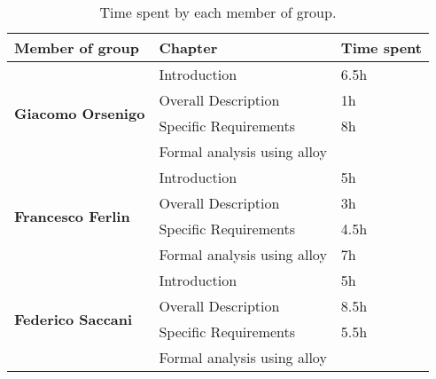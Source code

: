 \begin{table}[H]
      \centering
      \begin{tabular}{|l|l|l|}
            \hline
            \textbf{Member of group }                  & \textbf{Chapter}            & \textbf{Time spent} \\\hline
            \multirow{4}{*}{\textbf{Giacomo Orsenigo}} & Introduction                & 6.5h                \\
                                                       & Overall Description         & 1h                  \\
                                                       & Specific Requirements       & 8h                  \\
                                                       & Formal analysis using alloy &                     \\\hline
            \multirow{4}{*}{\textbf{Francesco Ferlin}} & Introduction                & 5h                  \\
                                                       & Overall Description         & 3h                  \\
                                                       & Specific Requirements       & 4.5h                \\
                                                       & Formal analysis using alloy & 7h                  \\\hline
            \multirow{4}{*}{\textbf{Federico Saccani}} & Introduction                & 5h                  \\
                                                       & Overall Description         & 8.5h                \\
                                                       & Specific Requirements       & 5.5h                  \\
                                                       & Formal analysis using alloy &                     \\\hline
      \end{tabular}
      \caption{Time spent by each member of group.}
      \label{table:Time spent}
\end{table}
